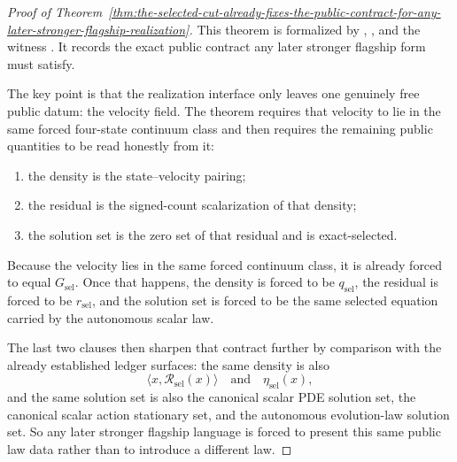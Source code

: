\begin{proof}[Proof of Theorem~\ref{thm:the-selected-cut-already-fixes-the-public-contract-for-any-later-stronger-flagship-realization}]
\label{proof:thm:the-selected-cut-already-fixes-the-public-contract-for-any-later-stronger-flagship-realization}
This theorem is formalized by
,
, and the witness
.
It records the exact public contract any later stronger flagship form must
satisfy.

The key point is that the realization interface only leaves one genuinely free
public datum: the velocity field. The theorem requires that velocity to lie in
the same forced four-state continuum class and then requires the remaining
public quantities to be read honestly from it:
\begin{enumerate}
\item the density is the state--velocity pairing;
\item the residual is the signed-count scalarization of that density;
\item the solution set is the zero set of that residual and is exact-selected.
\end{enumerate}
Because the velocity lies in the same forced continuum class, it is already
forced to equal \(G_{\mathrm{sel}}\). Once that happens, the density is
forced to be \(q_{\mathrm{sel}}\), the residual is forced to be
\(r_{\mathrm{sel}}\), and the solution set is forced to be the same selected
equation carried by the autonomous scalar law.

The last two clauses then sharpen that contract further by comparison with the
already established ledger surfaces: the same density is also
\[
\langle x,\mathcal R_{\mathrm{sel}}(x)\rangle
\quad\text{and}\quad
\eta_{\mathrm{sel}}(x),
\]
and the same solution set is also the canonical scalar PDE solution set, the
canonical scalar action stationary set, and the autonomous evolution-law
solution set. So any later stronger flagship language is forced to present
this same public law data rather than to introduce a different law.
\end{proof}


